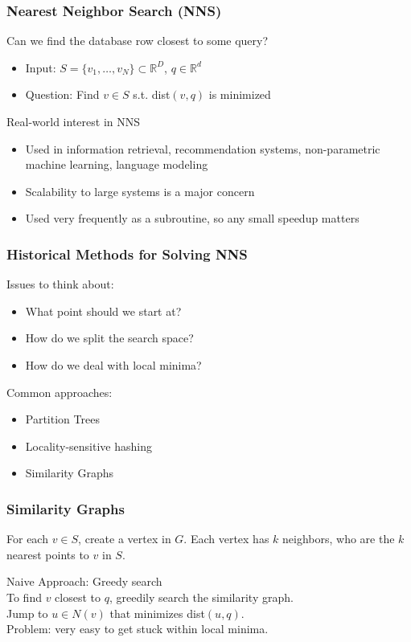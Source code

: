 \begin{frame}[t]
	\frametitle{Nearest Neighbor Search (NNS)}
		Can we find the database row closest to some query?
		\onslide<2-3> {
			\begin{itemize}
				\item Input: $S = \{v_1, \dots, v_N\} \subset \mathbb{R}^D$, $q \in \mathbb{R}^d$
				\item Question: Find $v \in S$ s.t. dist$(v, q)$ is minimized
			\end{itemize}
		}
		\vspace{5.0em}
		Real-world interest in NNS
		\onslide<3> {
			\begin{itemize}
				\item Used in information retrieval, recommendation systems, non-parametric machine learning, language modeling
				\item Scalability to large systems is a major concern
				\item Used very frequently as a subroutine, so any small speedup matters
			\end{itemize}
		}
\end{frame}

\begin{frame}[t]
	\frametitle{Historical Methods for Solving NNS}
	Issues to think about:
		\onslide<2-3> {
			\begin{itemize}
				\item What point should we start at?
				\item How do we split the search space?
				\item How do we deal with local minima?
			\end{itemize}
		}
		\vspace{5.0em}
		Common approaches:
		\onslide<3> {
			\begin{itemize}
				\item Partition Trees
				\item Locality-sensitive hashing
				\item Similarity Graphs
			\end{itemize}
		}
\end{frame}

\begin{frame}[t]
	\frametitle{Similarity Graphs}
	For each $v \in S$, create a vertex in $G$.
	Each vertex has $k$ neighbors, who are the $k$ nearest points to $v$ in $S$.

	\vspace{3.0em}
	 {
		Naive Approach: Greedy search\\
		To find $v$ closest to $q$, greedily search the similarity graph.\\
		Jump to $u \in N(v)$ that minimizes dist$(u,q)$.\\
		Problem: very easy to get stuck within local minima.
	}
\end{frame}


